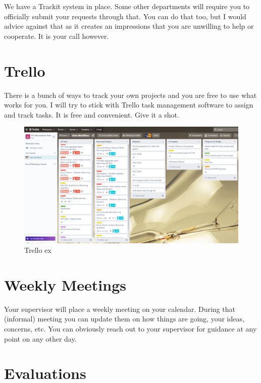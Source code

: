 \documentclass[
]{book}
\begin{document}
\leavevmode\hypertarget{hello}{}%
We have a Trackit system in place. Some other departments will require you to officially submit your requests through that. You can do that too, but I would advice against that as it creates an impressions that you are unwilling to help or cooperate. It is your call however.

\hypertarget{trello}{%
\section{Trello}\label{trello}}

There is a bunch of ways to track your own projects and you are free to use what works for you. I will try to stick with Trello task management software to assign and track tasks. It is free and convenient. Give it a shot.

\begin{figure}
\centering
\includegraphics{my_files/trello.png}
\caption{Trello ex}
\end{figure}

\hypertarget{weekly-meetings}{%
\section{Weekly Meetings}\label{weekly-meetings}}

Your supervisor will place a weekly meeting on your calendar. During that (informal) meeting you can update them on how things are going, your ideas, concerns, etc. You can obviously reach out to your supervisor for guidance at any point on any other day.

\hypertarget{evaluations}{%
\section{Evaluations}\label{evaluations}}
\end{document}
